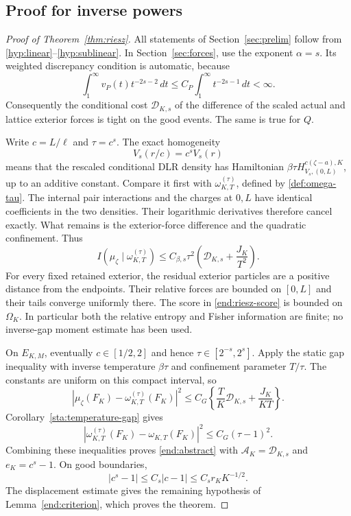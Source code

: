 \documentclass[11pt,reqno]{amsart}
\numberwithin{equation}{section}
\theoremstyle{definition}
\newcommand{\1}{\mathbf 1}
\newcommand{\dd}{\,d}
\newcommand{\abs}[1]{\left|#1\right|}
\begin{document}
\subsection{Proof for inverse powers}
\begin{proof}[Proof of Theorem~\ref{thm:riesz}]
All statements of Section~\ref{sec:prelim} follow from
\eqref{hyp:linear}--\eqref{hyp:sublinear}. In
Section~\ref{sec:forces}, use the exponent $\alpha=s$.
Its weighted discrepancy condition is automatic, because
\begin{equation}\label{end:weighted-auto}
\int_1^\infty v_P(t)t^{-2s-2}\dd t
\le C_P\int_1^\infty t^{-2s-1}\dd t<\infty.
\end{equation}
Consequently the conditional cost $\mathcal D_{K,s}$ of the
difference of the scaled actual and lattice exterior forces is tight
on the good events. The same is true for $Q$.

Write $c=L/\ell$ and $\tau=c^s$. The exact homogeneity
\[
V_s(r/c)=c^sV_s(r)
\]
means that the rescaled conditional DLR density has Hamiltonian
$\beta\tau H_{V_s,(0,L)}^{c(\zeta-a),K}$, up to an additive constant.
Compare it first with $\omega_{K,T}^{(\tau)}$, defined by
\eqref{def:omega-tau}. The internal pair interactions and the charges
at $0,L$ have identical coefficients in the two densities.
Their logarithmic derivatives therefore cancel exactly. What remains is
the exterior-force difference and the quadratic confinement. Thus
\begin{equation}\label{end:riesz-score}
I(\mu_\zeta\mid\omega_{K,T}^{(\tau)})
\le C_{\beta,s}\tau^2
\left(\mathcal D_{K,s}+\frac{J_K}{T^2}\right).
\end{equation}
For every fixed retained exterior, the residual exterior particles are
a positive distance from the endpoints. Their relative forces are
bounded on $[0,L]$ and their tails converge uniformly there.
The score in \eqref{end:riesz-score} is bounded on $\Omega_K$.
In particular both the relative entropy and Fisher information are
finite; no inverse-gap moment estimate has been used.

On $E_{K,M}$, eventually $c\in[1/2,2]$ and hence
$\tau\in[2^{-s},2^s]$. Apply the static gap inequality with inverse
temperature $\beta\tau$ and confinement parameter $T/\tau$.
The constants are uniform on this compact interval, so
\[
\abs{\mu_\zeta(F_K)-\omega_{K,T}^{(\tau)}(F_K)}^2
\le C_G\left\{\frac{T}{K}\mathcal D_{K,s}
+\frac{J_K}{KT}\right\}.
\]
Corollary~\ref{sta:temperature-gap} gives
\[
\abs{\omega_{K,T}^{(\tau)}(F_K)-\omega_{K,T}(F_K)}^2
\le C_G(\tau-1)^2.
\]
Combining these inequalities proves \eqref{end:abstract} with
$\mathcal A_K=\mathcal D_{K,s}$ and $e_K=c^s-1$.
On good boundaries,
\[
|c^s-1|\le C_s|c-1|\le C_sr_KK^{-1/2}.
\]
The displacement estimate gives the remaining hypothesis of
Lemma~\ref{end:criterion}, which proves the theorem.
\end{proof}
\end{document}
